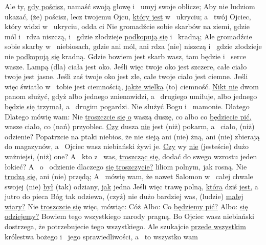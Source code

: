  Ale ty, \underline{gdy pościsz,} namaść swoją głowę i~ umyj swoje oblicze;
 Aby nie ludziom ukazać, (że) pościsz, lecz twojemu Ojcu, \underline{który jest} w~ ukryciu; a~ twój Ojciec, który widzi w~ ukryciu, odda ci
 Nie gromadźcie sobie skarbów na ziemi, gdzie mól i~ rdza niszczą, i~ gdzie złodzieje \underline{podkopują się} i~ kradną;
 Ale gromadźcie sobie skarby w~ niebiosach, gdzie ani mól, ani rdza (nie) niszczą i~ gdzie złodzieje nie \underline{podkopują się}  kradną.
 Gdzie bowiem jest skarb wasz, tam będzie i~ serce wasze.
 Lampą (dla) ciała jest oko. Jeśli więc twoje oko jest szczere, całe ciało twoje jest jasne.
 Jeśli zaś twoje oko jest złe, całe twoje ciało jest ciemne. Jeśli więc światło w~ tobie jest ciemnością, \underline{jakże wielka} (to) ciemność.
 \underline{Nikt nie}  dwom panom służyć, gdyż albo jednego znienawidzi, a~ drugiego umiłuje, albo jednego \underline{będzie się trzymał,} a~ drugim pogardzi. Nie  służyć Bogu i~ mamonie.
 Dlatego Dlatego mówię wam: Nie \underline{troszczcie się o} waszą duszę, co  albo co \underline{będziecie pić,}  wasze ciało, co (nań) przyoblec. \underline{Czy} dusza \underline{nie} jest  (niż) pokarm, a~ ciało, (niż) odzienie?
 Popatrzcie na ptaki niebios, że nie sieją ani (nie) żną, ani (nie) zbierają do magazynów, a~ Ojciec wasz niebiański żywi je. \underline{Czy} wy \underline{nie} (jesteście) dużo ważniejsi, (niż) one?
 A~ kto z~ was, \underline{troszcząc się,}  dodać do swego wzrostu jeden łokieć?
 A~ o~ odzienie dlaczego \underline{się troszczycie?}  liliom polnym, jak rosną. Nie \underline{trudzą się,} ani (nie) przędą;
 A~ mówię wam, że nawet Salomon w~ całej chwale swojej (nie) \underline{był} (tak) odziany, \underline{jak} jedna 
 Jeśli więc trawę polną, \underline{która} dziś \underline{jest,} a~ jutro do pieca  Bóg tak odziewa, (czyż) nie dużo bardziej was, (ludzie) \underline{małej wiary?}
 Nie \underline{troszczcie się} więc, mówiąc: Cóż  Albo: Co \underline{będziemy pić?} Albo:  \underline{się odziejemy?}
 Bowiem tego wszystkiego narody pragną. Bo Ojciec wasz niebiański dostrzega, że potrzebujecie tego wszystkiego.
 Ale szukajcie \underline{przede wszystkim} królestwa bożego i~ jego sprawiedliwości, a~ to wszystko  wam 
